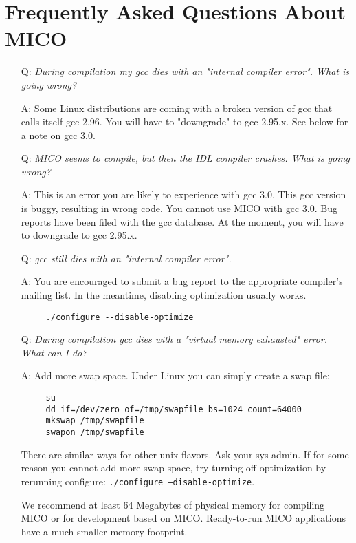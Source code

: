 

\chapter{Frequently Asked Questions About MICO}

\begin{itemize}
\item[Q:] \emph{During compilation my gcc dies with an
    "internal compiler error". What is going wrong?}
\item[A:] Some Linux distributions are coming with a broken version of
  gcc that calls itself gcc 2.96. You will have to "downgrade" to gcc
  2.95.x. See below for a note on gcc 3.0.
\end{itemize}

\begin{itemize}
\item[Q:] \emph{MICO seems to compile, but then the IDL compiler crashes.
    What is going wrong?}
\item[A:] This is an error you are likely to experience with gcc 3.0. This
  gcc version is buggy, resulting in wrong code. You cannot use MICO with
  gcc 3.0. Bug reports have been filed with the gcc database. At the moment,
  you will have to downgrade to gcc 2.95.x.
\end{itemize}

\begin{itemize}
\item[Q:] \emph{gcc still dies with an "internal compiler error".}
\item[A:] You are encouraged to submit a bug report to the appropriate
  compiler's mailing list. In the meantime, disabling optimization
  usually works.

  \begin{verbatim}
     ./configure --disable-optimize
  \end{verbatim}
\end{itemize}

\begin{itemize}
\item[Q:] \emph{During compilation gcc dies with a "virtual memory
    exhausted" error.  What can I do?}

\item[A:] Add more swap space. Under Linux you can simply create a
  swap file:
  
  \begin{verbatim}
     su
     dd if=/dev/zero of=/tmp/swapfile bs=1024 count=64000
     mkswap /tmp/swapfile
     swapon /tmp/swapfile
  \end{verbatim}

  There are similar ways for other unix flavors. Ask your sys admin.
  If for some reason you cannot add more swap space, try turning off
  optimization by rerunning configure: \texttt{./configure
    --disable-optimize}.

  We recommend at least 64 Megabytes of physical memory for compiling
  MICO or for development based on MICO. Ready-to-run MICO applications
  have a much smaller memory footprint.
\end{itemize}

